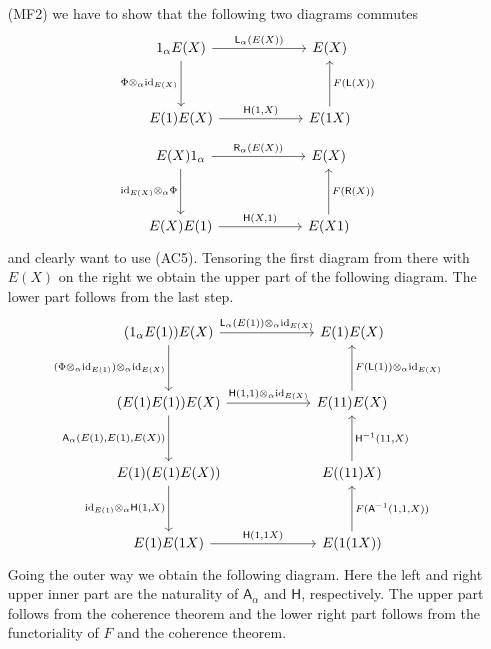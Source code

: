 \begin{prf}
\begin{enumerate}
\item[(MF2)]
we have to show that the following two diagrams commutes
\begin{equation*}
\begin{tikzcd}[row sep=3.3em,column sep=6em]
  1_{\alpha} E(X)
  \ar{r}{\mathsf{L}_{\alpha}(E(X))}
  \ar{d}[swap]{\Phi \otimes_{\alpha} \mathrm{id}_{E(X)}}
  &
  E(X)
  \\
  E(1) E(X)
  \ar{r}{\mathsf{H}(1,X)}
  &
  E(1 X)
  \ar{u}[swap]{F(\mathsf{L}(X))}
\end{tikzcd}
\end{equation*}
\begin{equation*}
\begin{tikzcd}[row sep=3.3em,column sep=6em]
  E(X) 1_{\alpha}
  \ar{r}{\mathsf{R}_{\alpha}(E(X))}
  \ar{d}[swap]{\mathrm{id}_{E(X)} \otimes_{\alpha} \Phi}
  &
  E(X)
  \\
  E(X) E(1)
  \ar{r}{\mathsf{H}(X,1)}
  &
  E(X 1)
  \ar{u}[swap]{F(\mathsf{R}(X))}
\end{tikzcd}
\end{equation*}
and clearly want to use (AC5). Tensoring the first diagram from there with $E(X)$ on the right we obtain the upper part of the following diagram. The lower part follows from the last step.
\begin{equation*}
\begin{tikzcd}[row sep=3.3em,column sep=6em]
  (1_{\alpha} E(1)) E(X)
  \ar{r}{\mathsf{L}_{\alpha}(E(1)) \otimes_{\alpha} \mathrm{id}_{E(X)}}
  \ar{d}[swap]{(\Phi \otimes_{\alpha} \mathrm{id}_{E(1)}) \otimes_{\alpha} \mathrm{id}_{E(X)}}
  &
  E(1) E(X)
  \\
  (E(1) E(1)) E(X)
  \ar{r}{\mathsf{H}(1,1) \otimes_{\alpha} \mathrm{id}_{E(X)}}
  \ar{d}[swap]{\mathsf{A}_{\alpha}(E(1),E(1),E(X))}
  &
  E(1 1) E(X)
  \ar{u}[swap]{F(\mathsf{L}(1)) \otimes_{\alpha} \mathrm{id}_{E(X)}}
  \\
  E(1) (E(1) E(X))
  \ar{d}[swap]{\mathrm{id}_{E(1)} \otimes_{\alpha} \mathsf{H}(1,X)}
  &
  E((1 1) X)
  \ar{u}[swap]{\mathsf{H}^{-1}(1 1,X)}
  \\
  E(1) E(1 X)
  \ar{r}{\mathsf{H}(1,1 X)}
  &
  E(1 (1 X))
  \ar{u}[swap]{F(\mathsf{A}^{-1}(1,1,X))}
\end{tikzcd}
\end{equation*}
\newpage
Going the outer way we obtain the following diagram. Here the left and right upper inner part are the naturality of $\mathsf{A}_{\alpha}$ and $\mathsf{H}$, respectively. The upper part follows from the coherence theorem and the lower right part follows from the functoriality of $F$ and the coherence theorem.

\end{enumerate}
\end{prf}
